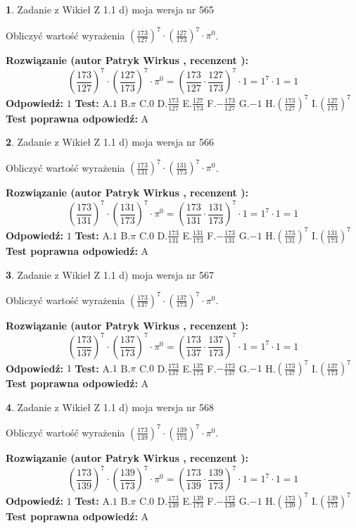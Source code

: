 \documentclass[12pt, a4paper]{article}
\theoremstyle{definition} %
\newtheorem{zad}{}
\newcommand{\zadStart}[1]{\begin{zad}#1\newline}
\newcommand{\zadStop}{\end{zad}}
\newcommand{\rozwStart}[2]{\noindent \textbf{Rozwiązanie (autor #1 , recenzent #2): }\newline}
\newcommand{\rozwStop}{\newline}
\newcommand{\odpStart}{\noindent \textbf{Odpowiedź:}\newline}
\newcommand{\odpStop}{\newline}
\newcommand{\testStart}{\noindent \textbf{Test:}\newline}
\newcommand{\testStop}{\newline}
\newcommand{\kluczStart}{\noindent \textbf{Test poprawna odpowiedź:}\newline}
\newcommand{\kluczStop}{\newline}
\begin{document}
\zadStart{Zadanie z Wikieł Z 1.1 d) moja wersja nr 565}

Obliczyć wartość wyrażenia $(\frac{173}{127})^{7} \cdot (\frac{127}{173})^{7} \cdot \pi^{0}$.
\zadStop
\rozwStart{Patryk Wirkus}{}
$$(\frac{173}{127})^{7} \cdot (\frac{127}{173})^{7} \cdot \pi^{0} = (\frac{173}{127} \cdot \frac{127}{173})^{7} \cdot 1 = 1^{7} \cdot 1 = 1$$
\rozwStop
\odpStart
$1$
\odpStop
\testStart
A.$1$ B.$\pi$ C.$0$ D.$\frac{173}{127}$ E.$\frac{127}{173}$
F.$-\frac{173}{127}$ G.$-1$
H.$(\frac{173}{127})^{7}$
I.$(\frac{127}{173})^{7}$
\testStop
\kluczStart
A
\kluczStop



\zadStart{Zadanie z Wikieł Z 1.1 d) moja wersja nr 566}

Obliczyć wartość wyrażenia $(\frac{173}{131})^{7} \cdot (\frac{131}{173})^{7} \cdot \pi^{0}$.
\zadStop
\rozwStart{Patryk Wirkus}{}
$$(\frac{173}{131})^{7} \cdot (\frac{131}{173})^{7} \cdot \pi^{0} = (\frac{173}{131} \cdot \frac{131}{173})^{7} \cdot 1 = 1^{7} \cdot 1 = 1$$
\rozwStop
\odpStart
$1$
\odpStop
\testStart
A.$1$ B.$\pi$ C.$0$ D.$\frac{173}{131}$ E.$\frac{131}{173}$
F.$-\frac{173}{131}$ G.$-1$
H.$(\frac{173}{131})^{7}$
I.$(\frac{131}{173})^{7}$
\testStop
\kluczStart
A
\kluczStop



\zadStart{Zadanie z Wikieł Z 1.1 d) moja wersja nr 567}

Obliczyć wartość wyrażenia $(\frac{173}{137})^{7} \cdot (\frac{137}{173})^{7} \cdot \pi^{0}$.
\zadStop
\rozwStart{Patryk Wirkus}{}
$$(\frac{173}{137})^{7} \cdot (\frac{137}{173})^{7} \cdot \pi^{0} = (\frac{173}{137} \cdot \frac{137}{173})^{7} \cdot 1 = 1^{7} \cdot 1 = 1$$
\rozwStop
\odpStart
$1$
\odpStop
\testStart
A.$1$ B.$\pi$ C.$0$ D.$\frac{173}{137}$ E.$\frac{137}{173}$
F.$-\frac{173}{137}$ G.$-1$
H.$(\frac{173}{137})^{7}$
I.$(\frac{137}{173})^{7}$
\testStop
\kluczStart
A
\kluczStop



\zadStart{Zadanie z Wikieł Z 1.1 d) moja wersja nr 568}

Obliczyć wartość wyrażenia $(\frac{173}{139})^{7} \cdot (\frac{139}{173})^{7} \cdot \pi^{0}$.
\zadStop
\rozwStart{Patryk Wirkus}{}
$$(\frac{173}{139})^{7} \cdot (\frac{139}{173})^{7} \cdot \pi^{0} = (\frac{173}{139} \cdot \frac{139}{173})^{7} \cdot 1 = 1^{7} \cdot 1 = 1$$
\rozwStop
\odpStart
$1$
\odpStop
\testStart
A.$1$ B.$\pi$ C.$0$ D.$\frac{173}{139}$ E.$\frac{139}{173}$
F.$-\frac{173}{139}$ G.$-1$
H.$(\frac{173}{139})^{7}$
I.$(\frac{139}{173})^{7}$
\testStop
\kluczStart
A
\kluczStop
\end{document}

